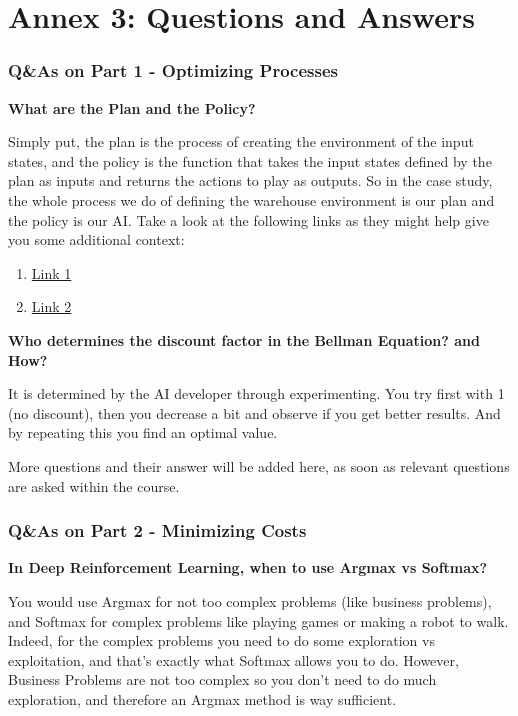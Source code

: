 \documentclass[]{book}
\begin{document}
\newpage

\hypertarget{annex-3-questions-and-answers}{%
\chapter{Annex 3: Questions and Answers}\label{annex-3-questions-and-answers}}

\subsection{Q\&As on Part 1 - Optimizing Processes}

\textbf{What are the Plan and the Policy?}

Simply put, the plan is the process of creating the environment of the input states, and the policy is the function that takes the input states defined by the plan as inputs and returns the actions to play as outputs. So in the case study, the whole process we do of defining the warehouse environment is our plan and the policy is our AI. Take a look at the following links as they might help give you some additional context:

\begin{enumerate}
    \item \href{http://www-anw.cs.umass.edu/~barto/courses/cs687/Chapter\%209.pdf}{Link 1}
    \item \href{https://www.quora.com/In-artificial-intelligence-which-is-better-policies-or-plans-and-why}{Link 2}
\end{enumerate}

\textbf{Who determines the discount factor in the Bellman Equation? and How?}

It is determined by the AI developer through experimenting. You try first with 1 (no discount), then you decrease a bit and observe if you get better results. And by repeating this you find an optimal value.

More questions and their answer will be added here, as soon as relevant questions are asked within the course.

\newpage

\subsection{Q\&As on Part 2 - Minimizing Costs}

\textbf{In Deep Reinforcement Learning, when to use Argmax vs Softmax?}

You would use Argmax for not too complex problems (like business problems), and Softmax for complex problems like playing games or making a robot to walk. Indeed, for the complex problems you need to do some exploration vs exploitation, and that's exactly what Softmax allows you to do. However, Business Problems are not too complex so you don't need to do much exploration, and therefore an Argmax method is way sufficient.
\end{document}

